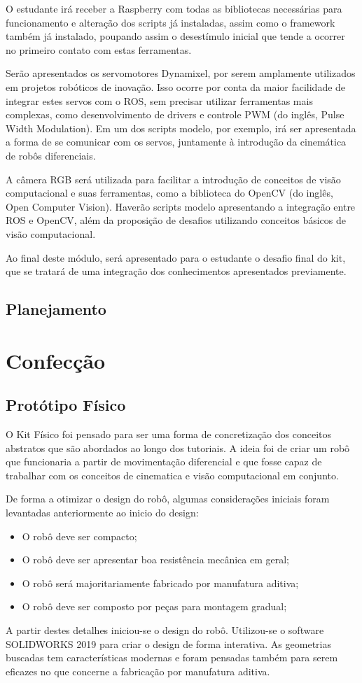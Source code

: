 O estudante irá receber a Raspberry com todas as bibliotecas necessárias para funcionamento e alteração dos scripts já instaladas, assim como o framework também já instalado, poupando assim o desestímulo inicial que tende a ocorrer no primeiro contato com estas ferramentas.

Serão apresentados os servomotores Dynamixel, por serem amplamente utilizados em projetos robóticos de inovação. Isso ocorre por conta da maior facilidade de integrar estes servos com o ROS, sem precisar utilizar ferramentas mais complexas, como desenvolvimento de drivers e controle PWM (do inglês, Pulse Width Modulation). Em um dos scripts modelo, por exemplo, irá ser apresentada a forma de se comunicar com os servos, juntamente à introdução da cinemática de robôs diferenciais.

A câmera RGB será utilizada para facilitar a introdução de conceitos de visão computacional e suas ferramentas, como a biblioteca do OpenCV (do inglês, Open Computer Vision). Haverão scripts modelo apresentando a integração entre ROS e OpenCV, além da proposição de desafios utilizando conceitos básicos de visão computacional.

Ao final deste módulo, será apresentado para o estudante o desafio final do kit, que se tratará de uma integração dos conhecimentos apresentados previamente.


\subsection{Planejamento}

\section{Confecção}
\subsection{Protótipo Físico}
O Kit Físico foi pensado para ser uma forma de concretização dos conceitos abstratos que são abordados ao longo dos tutoriais. A ideia foi de criar um robô que funcionaria a partir de movimentação diferencial e que fosse capaz de trabalhar com os conceitos de cinematica e visão computacional em conjunto.

De forma a otimizar o design do robô, algumas considerações iniciais foram levantadas anteriormente ao inicio do design:

\begin{itemize}
	\item O robô deve ser compacto;
	\item O robô deve ser apresentar boa resistência mecânica em geral;
	\item O robô será majoritariamente fabricado por manufatura aditiva;
	\item O robô deve ser composto por peças para montagem gradual;
\end{itemize}
A partir destes detalhes iniciou-se o design do robô. Utilizou-se o software SOLIDWORKS 2019 para criar o design de forma interativa. As geometrias buscadas tem características modernas e foram pensadas também para serem eficazes no que concerne a fabricação por manufatura aditiva.


